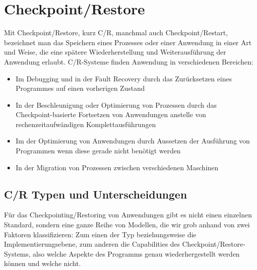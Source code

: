\documentclass[a4paper]{article}
\begin{document}
\section{Checkpoint/Restore}
Mit Checkpoint/Restore, kurz C/R, manchmal auch Checkpoint/Restart, bezeichnet man das Speichern eines Prozesses oder einer Anwendung in einer Art und Weise, die eine spätere Wiederherstellung und Weiterausführung der Anwendung erlaubt.
C/R-Systeme finden Anwendung in verschiedenen Bereichen:
\begin{itemize}
    \item Im Debugging und in der Fault Recovery durch das Zurücksetzen eines Programmes auf einen vorherigen Zustand
    \item In der Beschleunigung oder Optimierung von Prozessen durch das Checkpoint-basierte Fortsetzen von Anwendungen anstelle von rechenzeitaufwändigen Komplettausführungen
    \item Im der Optimierung von Anwendungen durch Aussetzen der Ausführung von Programmen wenn diese gerade nicht benötigt werden
    \item In der Migration von Prozessen zwischen verschiedenen Maschinen
\end{itemize}

\subsection{C/R Typen und Unterscheidungen}
Für das Checkpointing/Restoring von Anwendungen gibt es nicht einen einzelnen Standard, sondern eine ganze Reihe von Modellen, die wir grob anhand von zwei Faktoren klassifizieren: Zum einen der Typ beziehungsweise die Implementierungsebene, zum anderen die Capabilities des Checkpoint/Restore-Systems, also welche Aspekte des Programms genau wiederhergestellt werden können und welche nicht.
\end{document}
